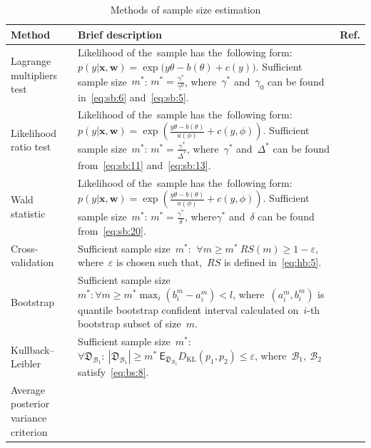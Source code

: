 \documentclass[
11pt,%
tightenlines,%
twoside,%
onecolumn,%
nofloats,%
nobibnotes,%
nofootinbib,%
superscriptaddress,%
noshowpacs,%
centertags]%
{revtex4}
\begin{document}
\begin{table}
\begin{center}
\caption{Methods of sample size estimation}
\label{table1}
\begin{tabular}{p{}|p{}|p{}}
\hline
    \centering Method &\centering Brief description & Ref.\\%
\hline
    Lagrange multipliers test &
    Likelihood of the~sample has the~following form: $p(y|\mathbf{x}, \mathbf{w}) = \exp\bigl(y\theta- b(\theta) + c(y)\bigr).$
    Sufficient sample size~$m^*$: $m^* = \frac{\gamma^*}{\gamma^0}$, where~$\gamma^*$ and~$\gamma_0$ can be found in~\eqref{eq:sb:6} and~\eqref{eq:sb:5}.
    &\cite{self1988}\\
\hline
    Likelihood ratio test &
    Likelihood of the~sample has the~following form: $p(y|\mathbf{x}, \mathbf{w}) = \exp\left(\frac{y\theta- b(\theta)}{a(\phi)} + c\left(y, \phi\right)\right).$ Sufficient sample size~$m^*$:  $m^* = \frac{\gamma^*}{\Delta^*}$, where~$\gamma^*$ and~$\Delta^*$ can be found from~\eqref{eq:sb:11} and~\eqref{eq:sb:13}.
    &\cite{shieh2000}\\
\hline
    Wald statistic &
    Likelihood of the~sample has the~following form: $p(y|\mathbf{x}, \mathbf{w}) = \exp\left(\frac{y\theta- b(\theta)}{a(\phi)} + c\left(y, \phi\right)\right).$ Sufficient sample size~$m^*$: $m^* = \frac{\gamma^*}{\delta}$, where$\gamma^*$ and~$\delta$ can be found from~\eqref{eq:sb:20}.
    &\cite{shieh2005}\\
\hline
    Cross-validation &
    Sufficient sample size~$m^*$: $~\forall m \geq m^*~RS(m) \geq 1- \varepsilon$, where~$\varepsilon$ is chosen such that,~$RS$ is defined in~\eqref{eq:hb:5}.
    &\cite{motrenko2014}\\
\hline
    Bootstrap &
    Sufficient sample size~$m^*: \forall m\geq m^* \max_i\left(b^m_i - a^m_i\right) < l$, where~$(a^m_i, b^m_i)$ is quantile bootstrap confident interval calculated on~$i$-th bootstrap subset of size~$m$.
    &\cite{qumsiyeh2013}\\
\hline
    Kullback--Leibler &
    Sufficient sample size~$m^*$: $\forall \mathfrak{D}_{\mathcal{B}_1}:~\left|\mathfrak{D}_{\mathcal{B}_1}\right| \geq m^* ~ \mathsf{E}_{\mathfrak{D}_{\mathcal{B}_2}}D_\text{KL}\left(p_1, p_2\right) \leq \varepsilon$,
    where~$\mathcal{B}_1,~\mathcal{B}_2$ satisfy~\eqref{eq:bs:8}.
    &\cite{motrenko2014}\\
\hline
    Average posterior variance criterion &

\end{tabular}
\end{center}
\end{table}
\end{document}
